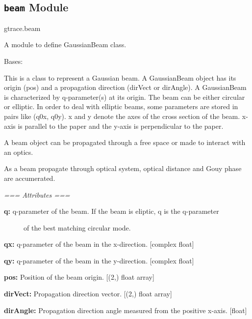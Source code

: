 \documentclass[letterpaper,10pt,english]{sphinxmanual}
\begin{document}
\subsection{\texttt{beam} Module}
\label{api/gtrace:module-gtrace.beam}\label{api/gtrace:beam-module}
gtrace.beam

A module to define GaussianBeam class.

\begin{fulllineitems}
\label{api/gtrace:gtrace.beam.GaussianBeam}
Bases: 

This is a class to represent a Gaussian beam.
A GaussianBeam object has its origin (pos) and a propagation
direction (dirVect or dirAngle).
A GaussianBeam is characterized by q-parameter(s) at its origin.
The beam can be either circular or elliptic. In order to deal with
elliptic beams, some parameters are stored in pairs like (q0x, q0y).
x and y denote the axes of the cross section of the beam. x-axis is
parallel to the paper and the y-axis is perpendicular to the paper.

A beam object can be propagated through a free space or made
to interact with an optics.

As a beam propagate through optical system, optical distance and
Gouy phase are accumerated.

\emph{=== Attributes ===}
\begin{description}
\item[{\textbf{q:} q-parameter of the beam. If the beam is eliptic, q is the q-parameter}] \leavevmode
of the best matching circular mode.

\end{description}

\textbf{qx:} q-parameter of the beam in the x-direction. {[}complex float{]}

\textbf{qy:} q-parameter of the beam in the y-direction. {[}complex float{]}

\textbf{pos:} Position of the beam origin. {[}(2,) float array{]}

\textbf{dirVect:} Propagation direction vector. {[}(2,) float array{]}

\textbf{dirAngle:} Propagation direction angle measured from the positive x-axis. {[}float{]}


\end{fulllineitems}
\end{document}
